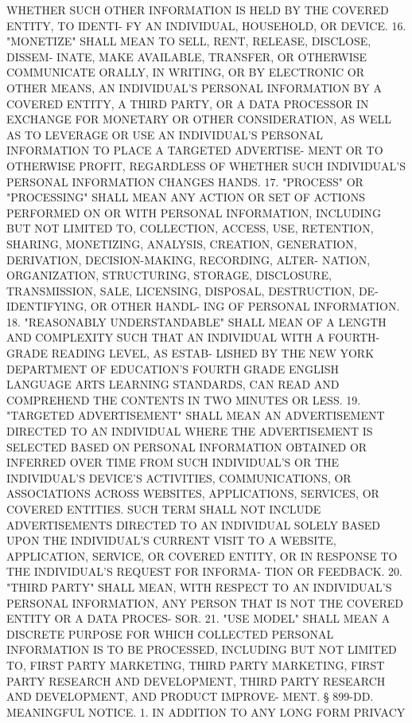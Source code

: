  WHETHER SUCH OTHER INFORMATION IS HELD BY THE COVERED ENTITY, TO IDENTI-
 FY AN INDIVIDUAL, HOUSEHOLD, OR DEVICE.
   16.  "MONETIZE"  SHALL  MEAN TO SELL, RENT, RELEASE, DISCLOSE, DISSEM-
 INATE, MAKE AVAILABLE, TRANSFER, OR  OTHERWISE  COMMUNICATE  ORALLY,  IN
 WRITING,  OR  BY  ELECTRONIC  OR  OTHER  MEANS, AN INDIVIDUAL'S PERSONAL
 INFORMATION BY A COVERED ENTITY, A THIRD PARTY, OR A DATA  PROCESSOR  IN
 EXCHANGE  FOR MONETARY OR OTHER CONSIDERATION, AS WELL AS TO LEVERAGE OR
 USE AN INDIVIDUAL'S PERSONAL INFORMATION TO PLACE A TARGETED  ADVERTISE-
 MENT  OR  TO  OTHERWISE  PROFIT, REGARDLESS OF WHETHER SUCH INDIVIDUAL'S
 PERSONAL INFORMATION CHANGES HANDS.
   17. "PROCESS" OR "PROCESSING" SHALL MEAN ANY ACTION OR SET OF  ACTIONS
 PERFORMED ON OR WITH PERSONAL INFORMATION, INCLUDING BUT NOT LIMITED TO,
 COLLECTION,  ACCESS,  USE,  RETENTION,  SHARING,  MONETIZING,  ANALYSIS,
 CREATION, GENERATION,  DERIVATION,  DECISION-MAKING,  RECORDING,  ALTER-
 NATION,  ORGANIZATION,  STRUCTURING,  STORAGE, DISCLOSURE, TRANSMISSION,
 SALE, LICENSING, DISPOSAL, DESTRUCTION, DE-IDENTIFYING, OR OTHER  HANDL-
 ING OF PERSONAL INFORMATION.
   18.  "REASONABLY UNDERSTANDABLE" SHALL MEAN OF A LENGTH AND COMPLEXITY
 SUCH THAT AN INDIVIDUAL WITH A FOURTH-GRADE  READING  LEVEL,  AS  ESTAB-
 LISHED  BY  THE  NEW YORK DEPARTMENT OF EDUCATION'S FOURTH GRADE ENGLISH
 LANGUAGE ARTS LEARNING STANDARDS, CAN READ AND COMPREHEND  THE  CONTENTS
 IN TWO MINUTES OR LESS.
   19.  "TARGETED  ADVERTISEMENT" SHALL MEAN AN ADVERTISEMENT DIRECTED TO
 AN INDIVIDUAL WHERE THE ADVERTISEMENT  IS  SELECTED  BASED  ON  PERSONAL
 INFORMATION OBTAINED OR INFERRED OVER TIME FROM SUCH INDIVIDUAL'S OR THE
 INDIVIDUAL'S DEVICE'S ACTIVITIES, COMMUNICATIONS, OR ASSOCIATIONS ACROSS
 WEBSITES,  APPLICATIONS,  SERVICES, OR COVERED ENTITIES. SUCH TERM SHALL
 NOT INCLUDE ADVERTISEMENTS DIRECTED TO AN INDIVIDUAL SOLELY  BASED  UPON
 THE  INDIVIDUAL'S  CURRENT  VISIT TO A WEBSITE, APPLICATION, SERVICE, OR
 COVERED ENTITY, OR IN RESPONSE TO THE INDIVIDUAL'S REQUEST FOR  INFORMA-
 TION OR FEEDBACK.
   20. "THIRD PARTY" SHALL MEAN, WITH RESPECT TO AN INDIVIDUAL'S PERSONAL
 INFORMATION, ANY PERSON THAT IS NOT THE COVERED ENTITY OR A DATA PROCES-
 SOR.
   21.  "USE  MODEL"  SHALL  MEAN  A DISCRETE PURPOSE FOR WHICH COLLECTED
 PERSONAL INFORMATION IS TO BE PROCESSED, INCLUDING BUT NOT  LIMITED  TO,
 FIRST  PARTY  MARKETING, THIRD PARTY MARKETING, FIRST PARTY RESEARCH AND
 DEVELOPMENT, THIRD PARTY RESEARCH AND DEVELOPMENT, AND PRODUCT  IMPROVE-
 MENT.
   §  899-DD.  MEANINGFUL NOTICE. 1. IN ADDITION TO ANY LONG FORM PRIVACY
